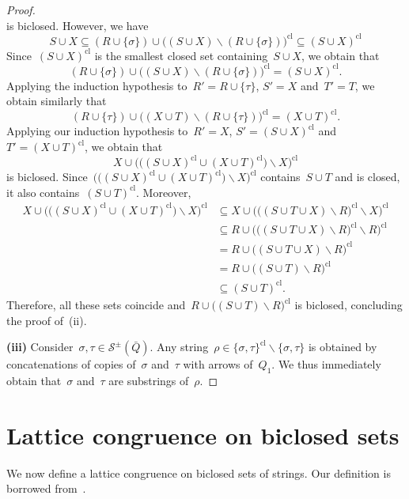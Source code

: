 \documentclass{amsart}
\theoremstyle{definition}
\newcommand{\ssm}{\smallsetminus} %
\newcommand{\strings}{\mathcal{S}} %
\newcommand{\closure}[1]{#1^{\mathrm{cl}}} %
\begin{document}
\begin{proof}
\[\]
is biclosed. However, we have
\[
S \cup X \subseteq (R \cup \{\sigma\}) \cup \closure{\big( ( S \cup X ) \ssm (R \cup \{\sigma\}) \big)} \subseteq \closure{(S \cup X)}
\]
Since~$\closure{(S \cup X)}$ is the smallest closed set containing~$S \cup X$, we obtain that
\[
(R \cup \{\sigma\}) \cup \closure{\big( ( S \cup X ) \ssm (R \cup \{\sigma\}) \big)} = \closure{(S \cup X)}.
\]
Applying the induction hypothesis to~$R' = R \cup \{\tau\}$, $S' = X$ and~$T' = T$, we obtain similarly that
\[
(R \cup \{\tau\}) \cup \closure{\big( ( X \cup T ) \ssm (R \cup \{\tau\}) \big)} = \closure{(X \cup T)}.
\]
Applying our induction hypothesis to~$R' = X$, $S' = \closure{(S \cup X)}$ and~$T' = \closure{(X \cup T)}$, we obtain that
\[
X \cup \closure{\big( \big( \closure{(S \cup X)} \cup \closure{(X \cup T)} \big) \ssm X \big)}
\]
is biclosed. Since~$\closure{\big( \big( \closure{(S \cup X)} \cup \closure{(X \cup T)} \big) \ssm X \big)}$ contains~$S \cup T$ and is closed, it also contains~$\closure{(S \cup T)}$.
Moreover,
\begin{align*}
X \cup \closure{\big( \big( \closure{(S \cup X)} \cup \closure{(X \cup T)} \big) \ssm X \big)}
& \subseteq X \cup \closure{\big( \closure{\big( (S \cup T \cup X) \ssm R\big)} \ssm X \big)} \\
& \subseteq R \cup \closure{\big( \closure{\big( (S \cup T \cup X) \ssm R\big)} \ssm R \big)} \\
& = R \cup \closure{\big( (S \cup T \cup X) \ssm R \big)} \\
& = R \cup \closure{\big( (S \cup T) \ssm R \big)} \\
& \subseteq \closure{(S \cup T)}.
\end{align*}
Therefore, all these sets coincide and~$R \cup \closure{\big( (S \cup T) \ssm R \big)}$ is biclosed, concluding the proof of~(ii).

\medskip\noindent
{\bf (iii)}
Consider~$\sigma, \tau \in \strings^\pm(\bar Q)$.
Any string~$\rho \in \closure{\{\sigma, \tau\}} \ssm \{\sigma, \tau\}$ is obtained by concatenations of copies of~$\sigma$ and~$\tau$ with arrows of~$Q_1$.
We thus immediately obtain that~$\sigma$ and~$\tau$ are substrings of~$\rho$.
\end{proof}

\section{Lattice congruence on biclosed sets}
\label{sec:latticeCongruence}

We now define a lattice congruence on biclosed sets of strings.
Our definition is borrowed from~\cite[Sect.~7]{McConville}.
\end{document}
